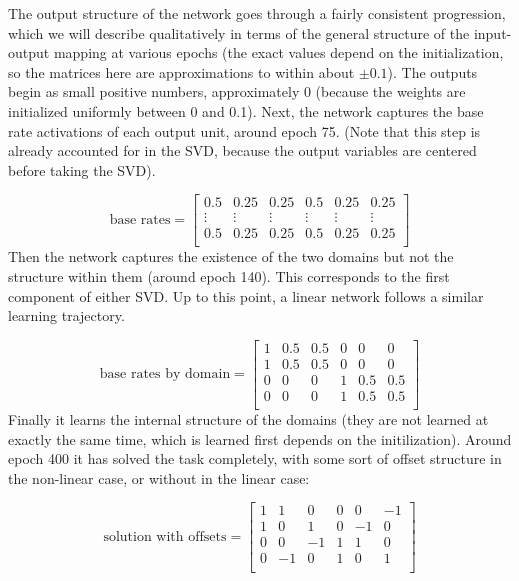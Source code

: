 \documentclass[10pt,letterpaper]{article}
\begin{document}
The output structure of the network goes through a fairly consistent progression, which we will describe qualitatively in terms of the general structure of the input-output mapping at various epochs (the exact values depend on the initialization, so the matrices here are approximations to within about \(\pm 0.1\)). The outputs begin as small positive numbers, approximately 0 (because the weights are initialized uniformly between 0 and 0.1). Next, the network captures the base rate activations of each output unit, around epoch 75. (Note that this step is already accounted for in the SVD, because the output variables are centered before taking the SVD). \par
{ 
\[ 
\text{base rates} = \left[ \begin{matrix} 
0.5 & 0.25 & 0.25 & 0.5 & 0.25 & 0.25 \\
\vdots & \vdots &\vdots &\vdots &\vdots &\vdots \\
 0.5 & 0.25 & 0.25 & 0.5 & 0.25 & 0.25\\
\end{matrix}  \right] 
\] 
}
Then the network captures the existence of the two domains but not the structure within them (around epoch 140). This corresponds to the first component of either SVD. Up to this point, a linear network follows a similar learning trajectory. \par
\vspace{-1em}
{ 
\[
\text{base rates by domain} = \left[ \begin{matrix} 
1 & 0.5 & 0.5 & 0 & 0 & 0 \\
1 & 0.5 & 0.5 & 0 & 0 & 0 \\
0 & 0 & 0 & 1 & 0.5 & 0.5  \\
0 & 0 & 0 & 1 & 0.5 & 0.5  \\
\end{matrix}  \right] 
\] 
}
Finally it learns the internal structure of the domains (they are not learned at exactly the same time, which is learned first depends on the initilization). Around epoch 400 it has solved the task completely, with some sort of offset structure in the non-linear case, or without in the linear case:\par
\vspace{-0.5em}
{ 
\[
\text{solution with offsets} = \left[ \begin{matrix} 
1 & 1 & 0 & 0 & 0 & -1 \\
1 & 0 & 1 & 0 & -1 & 0 \\
 0 & 0 & -1 & 1 & 1 & 0\\
 0 & -1 & 0 & 1 & 0 & 1\\
\end{matrix}  \right] 
\]
}
\end{document}
